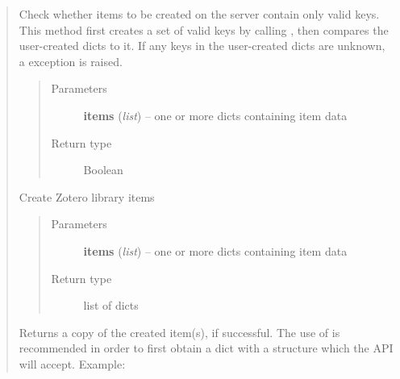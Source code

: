 \documentclass[letterpaper,10pt,english]{sphinxmanual}
\begin{document}
\begin{quote}

\begin{fulllineitems}
\label{index:pyzotero.zotero.Zotero.check_items}
Check whether items to be created on the server contain only valid keys. This method first creates a set of valid keys by calling {\hyperref[index:pyzotero.zotero.Zotero.item_fields]{}}, then compares the user-created dicts to it. If any keys in the user-created dicts are unknown, a  exception is raised.
\begin{quote}\begin{description}
\item[{Parameters}] \leavevmode
\textbf{items} (\emph{list}) -- one or more dicts containing item data

\item[{Return type}] \leavevmode
Boolean

\end{description}\end{quote}

\end{fulllineitems}



\begin{fulllineitems}
\label{index:pyzotero.zotero.Zotero.create_items}
Create Zotero library items
\begin{quote}\begin{description}
\item[{Parameters}] \leavevmode
\textbf{items} (\emph{list}) -- one or more dicts containing item data

\item[{Return type}] \leavevmode
list of dicts

\end{description}\end{quote}

Returns a copy of the created item(s), if successful. The use of {\hyperref[index:pyzotero.zotero.Zotero.item_template]{}} is recommended in order to first obtain a dict with a structure which the API will accept.
Example:


\end{fulllineitems}
\end{quote}
\end{document}
